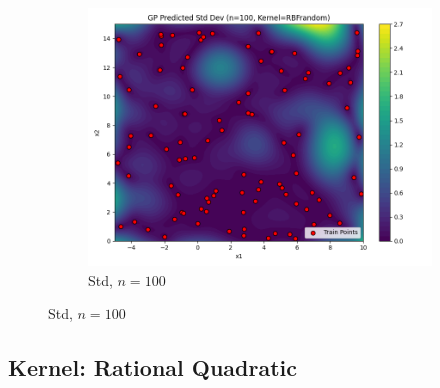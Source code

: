 \documentclass[a4paper,12pt]{article}
\begin{document}
\begin{figure}[H]
\begin{subfigure}{0.3\textwidth}
    \includegraphics[width=\linewidth]{Task-02/images/gp_std_rbf_n100_random.png}
    \caption{Std, $n=100$}  
\end{subfigure}
\end{figure}

\subsection*{Kernel: Rational Quadratic}
\end{document}
